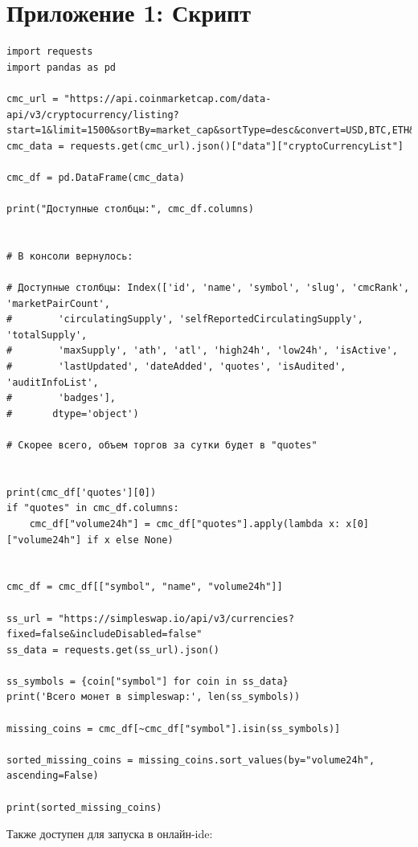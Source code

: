 \documentclass[12pt]{article}
\theoremstyle{indented}
\theoremstyle{definition}
\theoremstyle{remark}
\begin{document}
\section*{Приложение 1: Скрипт}
\begin{verbatim}
import requests
import pandas as pd

cmc_url = "https://api.coinmarketcap.com/data-api/v3/cryptocurrency/listing?start=1&limit=1500&sortBy=market_cap&sortType=desc&convert=USD,BTC,ETH&cryptoType=all&tagType=all&audited=false&aux=ath,atl,high24h,low24h,num_market_pairs,cmc_rank,date_added,max_supply,circulating_supply,total_supply,volume_7d,volume_30d,self_reported_circulating_supply,self_reported_market_cap"
cmc_data = requests.get(cmc_url).json()["data"]["cryptoCurrencyList"]

cmc_df = pd.DataFrame(cmc_data)

print("Доступные столбцы:", cmc_df.columns)


# В консоли вернулось:

# Доступные столбцы: Index(['id', 'name', 'symbol', 'slug', 'cmcRank', 'marketPairCount',
#        'circulatingSupply', 'selfReportedCirculatingSupply', 'totalSupply',
#        'maxSupply', 'ath', 'atl', 'high24h', 'low24h', 'isActive',
#        'lastUpdated', 'dateAdded', 'quotes', 'isAudited', 'auditInfoList',
#        'badges'],
#       dtype='object')

# Скорее всего, объем торгов за сутки будет в "quotes" 


print(cmc_df['quotes'][0])
if "quotes" in cmc_df.columns:
    cmc_df["volume24h"] = cmc_df["quotes"].apply(lambda x: x[0]["volume24h"] if x else None)


cmc_df = cmc_df[["symbol", "name", "volume24h"]]

ss_url = "https://simpleswap.io/api/v3/currencies?fixed=false&includeDisabled=false"
ss_data = requests.get(ss_url).json()

ss_symbols = {coin["symbol"] for coin in ss_data}
print('Всего монет в simpleswap:', len(ss_symbols))

missing_coins = cmc_df[~cmc_df["symbol"].isin(ss_symbols)]

sorted_missing_coins = missing_coins.sort_values(by="volume24h", ascending=False)

print(sorted_missing_coins)
\end{verbatim}

Также доступен для запуска в онлайн-ide: 
\end{document}
